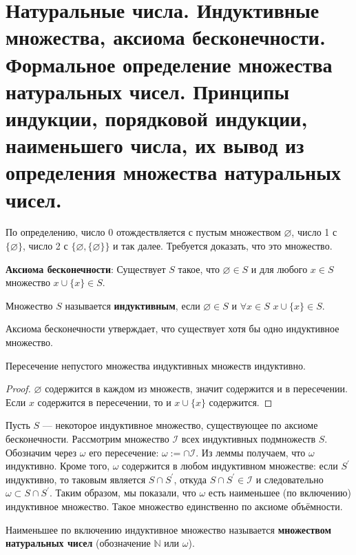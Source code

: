 \section[Индуктивные множества. Аксиома бесконечности. Определение множества натуральных чисел. Принципы индукции,
и наименьшего числа.]{Натуральные числа. Индуктивные множества, аксиома бесконечности. Формальное определение
множества натуральных чисел. Принципы индукции, порядковой индукции, наименьшего числа, их вывод из определения
множества натуральных чисел.}

По определению, число 0 отождествляется с пустым множеством $\varnothing$, число 1 с $\{ \varnothing \}$, число 2 с
$\{ \varnothing, \{ \varnothing \}\}$ и так далее. Требуется доказать, что это множество.

\textbf{Аксиома бесконечности}: Существует $S$ такое, что $\varnothing \in S$ и для любого $x \in S$ множество $x
\cup\{x\} \in S$.

\begin{definition}
	Множество $S$ называется \textbf{индуктивным}, если $\varnothing \in S$ и $\forall x \in S$ $x \cup\{x\}
	\in S$.
\end{definition}

Аксиома бесконечности утверждает, что существует хотя бы одно индуктивное множество.

\begin{lemma}
	Пересечение непустого множества индуктивных множеств индуктивно.
\end{lemma}

\begin{proof}{$\varnothing$ содержится в каждом из множеств, значит содержится и в пересечении. Если $x$ содержится
	в пересечении, то и $x \cup\{x\}$ содержится.}
\end{proof}

Пусть $S$ — некоторое индуктивное множество, существующее по аксиоме бесконечности. Рассмотрим множество
$\mathcal{I}$ всех индуктивных подмножеств $S$.
Обозначим через $\omega$ его пересечение: $\omega:=\cap \mathcal{I}$. Из леммы  получаем, что $\omega$ индуктивно.
Кроме того, $\omega$ содержится в любом индуктивном множестве: если $S^{\prime}$ индуктивно, то таковым является $S
\cap S^{\prime}$, откуда $S \cap S^{\prime} \in \mathcal{I}$ и следовательно $\omega \subset S \cap S^{\prime}$.
Таким образом, мы показали, что $\omega$ есть наименьшее (по включению) индуктивное множество. Такое множество
единственно по аксиоме объёмности.

\begin{definition}
	Наименьшее по включению индуктивное множество называется \textbf{множеством натуральных чисел}
	(обозначение $\mathbb{N}$ или $\omega$).
\end{definition}

